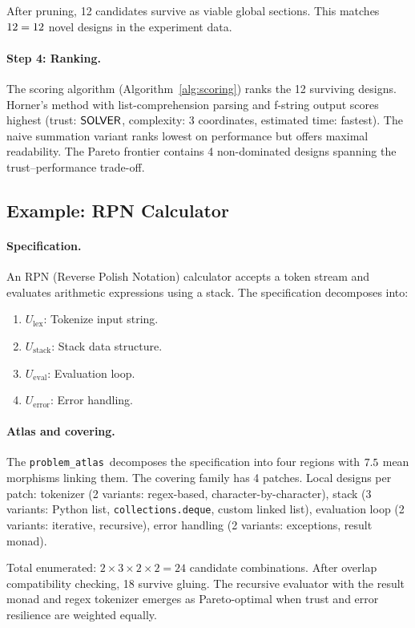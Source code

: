 \documentclass[11pt]{article}
\newcommand{\ProbAtlas}{\texttt{problem\_atlas}}
\begin{document}
After pruning, 12 candidates survive as viable global sections.
This matches $12 = 12$ novel designs in the
experiment data.

\paragraph{Step 4: Ranking.}
The scoring algorithm (Algorithm~\ref{alg:scoring}) ranks the
12 surviving designs.  Horner's method with list-comprehension
parsing and f-string output scores highest (trust: $\mathsf{SOLVER}$,
complexity: 3 coordinates, estimated time: fastest).  The naive
summation variant ranks lowest on performance but offers maximal
readability.  The Pareto frontier contains 4 non-dominated designs
spanning the trust--performance trade-off.

\subsection{Example: RPN Calculator}

\paragraph{Specification.}
An RPN (Reverse Polish Notation) calculator accepts a token stream
and evaluates arithmetic expressions using a stack.  The specification
decomposes into:
\begin{enumerate}[noitemsep]
  \item $U_{\text{lex}}$: Tokenize input string.
  \item $U_{\text{stack}}$: Stack data structure.
  \item $U_{\text{eval}}$: Evaluation loop.
  \item $U_{\text{error}}$: Error handling.
\end{enumerate}

\paragraph{Atlas and covering.}
The \ProbAtlas\ decomposes the specification into four regions with
$7.5$ mean morphisms linking them.  The covering
family has 4 patches.  Local designs per patch: tokenizer (2 variants:
regex-based, character-by-character), stack (3 variants: Python list,
\texttt{collections.deque}, custom linked list), evaluation loop (2
variants: iterative, recursive), error handling (2 variants: exceptions,
result monad).

Total enumerated: $2 \times 3 \times 2 \times 2 = 24$ candidate
combinations.  After overlap compatibility checking, 18 survive gluing.
The recursive evaluator with the result monad and regex tokenizer
emerges as Pareto-optimal when trust and error resilience are weighted
equally.
\end{document}
